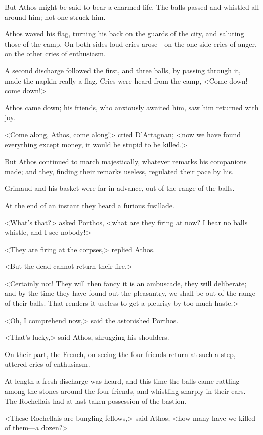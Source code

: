 But Athos might be said to bear a charmed life. The balls passed and whistled all around him; not one struck him. 

Athos waved his flag, turning his back on the guards of the city, and saluting those of the camp. On both sides loud cries arose—on the one side cries of anger, on the other cries of enthusiasm. 

A second discharge followed the first, and three balls, by passing through it, made the napkin really a flag. Cries were heard from the camp, <Come down! come down!> 

Athos came down; his friends, who anxiously awaited him, saw him returned with joy. 

<Come along, Athos, come along!> cried D'Artagnan; <now we have found everything except money, it would be stupid to be killed.> 

But Athos continued to march majestically, whatever remarks his companions made; and they, finding their remarks useless, regulated their pace by his. 

Grimaud and his basket were far in advance, out of the range of the balls. 

At the end of an instant they heard a furious fusillade. 

<What's that?> asked Porthos, <what are they firing at now? I hear no balls whistle, and I see nobody!> 

<They are firing at the corpses,> replied Athos. 

<But the dead cannot return their fire.> 

<Certainly not! They will then fancy it is an ambuscade, they will deliberate; and by the time they have found out the pleasantry, we shall be out of the range of their balls. That renders it useless to get a pleurisy by too much haste.> 

<Oh, I comprehend now,> said the astonished Porthos. 

<That's lucky,> said Athos, shrugging his shoulders. 

On their part, the French, on seeing the four friends return at such a step, uttered cries of enthusiasm. 

At length a fresh discharge was heard, and this time the balls came rattling among the stones around the four friends, and whistling sharply in their ears. The Rochellais had at last taken possession of the bastion. 

<These Rochellais are bungling fellows,> said Athos; <how many have we killed of them—a dozen?> 

